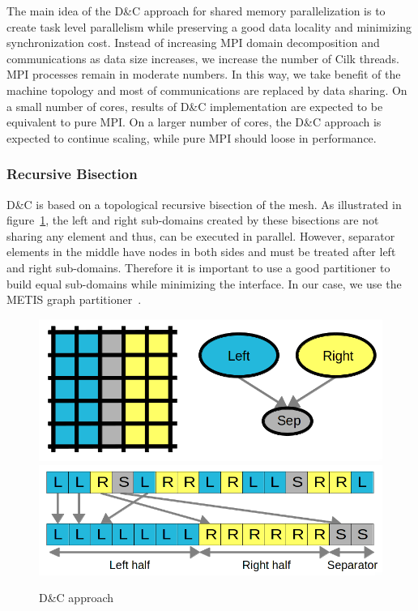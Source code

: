 \documentclass{IOS-Book-Article}
\begin{document}
The main idea of the D\&C approach for shared memory parallelization is to create task level parallelism while preserving a good data locality and minimizing synchronization cost.
Instead of increasing MPI domain decomposition and communications as data size increases, we increase the number of Cilk threads. MPI processes remain in moderate numbers.
In this way, we take benefit of the machine topology and most of communications are replaced by data sharing.
On a small number of cores, results of D\&C implementation are expected to be equivalent to pure MPI.
On a larger number of cores, the D\&C approach is expected to continue scaling, while pure MPI should loose in performance.

\subsubsection{Recursive Bisection}
D\&C is based on a topological recursive bisection of the mesh.
As illustrated in figure~\ref{fig:DCapp}, the left and right sub-domains created by these bisections are not sharing any element and thus, can be executed in parallel.
However, separator elements in the middle have nodes in both sides and must be treated after left and right sub-domains.
Therefore it is important to use a good partitioner to build equal sub-domains while minimizing the interface. In our case, we use the METIS graph partitioner~\cite{Metis}.
\begin{figure}[htp]
 \centering
 \includegraphics[scale=0.2]{DC_approach.png}
 \includegraphics[scale=0.2]{Data_permutations.png}
 \caption{D\&C approach}
 \label{fig:DCapp}
\end{figure}
\end{document}
